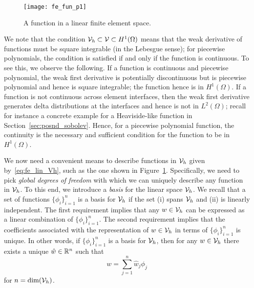 \begin{figure}
  \centering
  \texttt{[image: fe\_fun\_p1]}
  \caption{A function in a linear finite element space.}
  \label{fig:fe_fun_p1}
\end{figure}

We note that the condition $\mathcal{V}_h \subset \mathcal{V} \subset H^1(\Omega)$ means that the weak derivative of functions must be square integrable (in the Lebesgue sense); for piecewise polynomials, the condition is satisfied if and only if the function is continuous.  To see this, we observe the following.  If a function is continuous and piecewise polynomial, the weak first derivative is potentially discontinuous but is piecewise polynomial and hence is square integrable; the function hence is in $H^1(\Omega)$.  If a function is not continuous across element interfaces, then the weak first derivative generates delta distributions at the interfaces and hence is not in $L^2(\Omega)$; recall for instance a concrete example for a Heaviside-like function in Section~\ref{sec:posnd_sobolev}. Hence, for a piecewise polynomial function, the continuity is the necessary and sufficient condition for the function to be in $H^1(\Omega)$. 

We now need a convenient means to describe functions in $\mathcal{V}_h$ given by~\eqref{eq:fe_lin_Vh}, such as the one shown in Figure~\ref{fig:fe_fun_p1}.  Specifically, we need to pick \emph{global degrees of freedom} with which we can uniquely describe any function in $\mathcal{V}_h$. To this end, we introduce a \emph{basis} for the linear space $\mathcal{V}_h$.  We recall that a set of functions $\{ \phi_i \}_{i=1}^n$ is a basis for $\mathcal{V}_h$ if the set (i) spans $\mathcal{V}_h$ and (ii) is linearly independent. The first requirement implies that any $w \in \mathcal{V}_h$ can be expressed as a linear combination of $\{ \phi_i \}_{i=1}^n$.  The second requirement implies that the coefficients associated with the representation of $w \in \mathcal{V}_h$ in terms of $\{ \phi_i \}_{i=1}^n$ is unique.  In other words, if $\{ \phi_i \}_{i=1}^n$ is a basis for $\mathcal{V}_h$, then for any $w \in \mathcal{V}_h$ there exists a unique $\hat w \in \mathbb{R}^n$ such that
\begin{equation*}
  w = \sum_{j=1}^n \hat w_j \phi_j
\end{equation*}
for $n = \text{dim}(\mathcal{V}_h)$.


